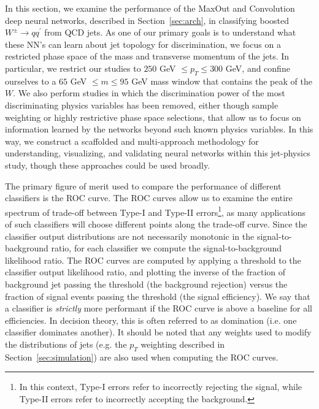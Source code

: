 
In this section, we examine the performance of the MaxOut and Convolution deep neural networks, described in Section~\ref{sec:arch}, in classifying boosted $W^\pm \to q q^\prime$ from QCD jets.  As one of our primary goals is to understand  what these NN's can learn about jet topology for discrimination, we focus on a restricted phase space of the mass and transverse momentum of the jets.  In particular, we restrict our studies to $250$ GeV $\leq p_T \leq 300$ GeV, and confine ourselves to a $65$ GeV $\leq m \leq 95$ GeV mass window that contains the peak of the $W$.   We also perform studies in which the discrimination power of the most discriminating physics variables has been removed, either though sample weighting or highly restrictive phase space selections, that allow us to focus on information learned by the networks beyond such known physics variables.  In this way, we construct a scaffolded and multi-approach methodology for understanding, visualizing, and validating neural networks within this jet-physics study, though these approaches could be used broadly.

The primary figure of merit used to compare the performance of different classifiers is the ROC curve.  The ROC curves allow us to examine the entire spectrum of trade-off between Type-I and Type-II errors\footnote{In this context, Type-I errors refer to incorrectly rejecting the signal, while Type-II errors refer to incorrectly accepting the background.}, as many applications of such classifiers will choose different points along the trade-off curve.   Since the classifier output distributions are not necessarily monotonic in the signal-to-background ratio, for each classifier we compute the  signal-to-background likelihood ratio.  The ROC curves are computed by applying a threshold to the classifier output likelihood ratio, and plotting the inverse of the fraction of background jet passing the threshold (the background rejection) versus the fraction of signal events passing the threshold (the signal efficiency).  We say that a classifier is \emph{strictly} more performant if the ROC curve is above a baseline for all efficiencies.  In decision theory, this is often referred to as domination (i.e. one classifier dominates another). It should be noted that any weights used to modify the distributions of jets (e.g. the $p_{T}$ weighting described in Section~\ref{sec:simulation}) are also used when computing the ROC curves.

%

